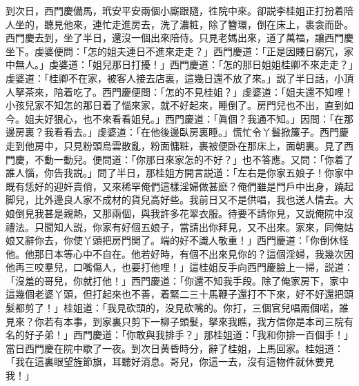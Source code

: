 到次日，西門慶備馬，玳安平安兩個小廝跟隨，徃院中來。卻説李桂姐正打扮着陪人坐的，聽見他來，連忙走進房去，洗了濃粧，除了簪環，倒在床上，裹衾而卧。西門慶去到，坐了半日，還沒一個出來陪侍。只見老媽出來，道了萬福，讓西門慶坐下。虔婆便問：「怎的姐夫連日不進來走走？」西門慶道：「正是因賤日窮冗，家中無人。」虔婆道：「姐兒那日打擾！」西門慶道：「怎的那日姐姐桂卿不來走走？」虔婆道：「桂卿不在家，被客人接去店裏，這幾日還不放了來。」説了半日話，小頂人拏茶來，陪着吃了。西門慶便問：「怎的不見桂姐？」虔婆道：「姐夫還不知哩！小孩兒家不知怎的那日着了惱來家，就不好起來，睡倒了。房門兒也不出，直到如今。姐夫好狠心，也不來看看姐兒。」西門慶道：「眞個？我通不知。」因問：「在那邊房裏？我看看去。」虔婆道：「在他後邊臥房裏睡。」慌忙令丫鬟掀簾子。西門慶走到他房中，只見粉頭烏雲散亂，粉面慵粧，裹被便卧在那床上，面朝裏。見了西門慶，不動一動兒。便問道：「你那日來家怎的不好？」也不答應。又問：「你着了誰人惱，你告我説。」問了半日，那桂姐方開言説道：「左右是你家五娘子！你家中既有恁好的迎奸賣俏，又來稀罕俺們這樣淫婦做甚麽？俺們雖是門戶中出身，蹺起脚兒，比外邊良人家不成材的貨兒高好些。我前日又不是供唱，我也送人情去。大娘倒見我甚是親熱，又那兩個，與我許多花翠衣服。待要不請你見，又説俺院中沒禮法。只聞知人説，你家有好個五娘子，當請出你拜見，又不出來。家來，同俺姑娘又辭你去，你使丫頭把房門関了。端的好不識人敬重！」西門慶道：「你倒休怪他。他那日本等心中不自在。他若好時，有個不出來見你的？這個淫婦，我幾次因他再三咬羣兒，口嘴傷人，也要打他哩！」這桂姐反手向西門慶臉上一掃，説道：「沒羞的哥兒，你就打他！」西門慶道：「你還不知我手段。除了俺家房下，家中這幾個老婆丫頭，但打起來也不善，着緊二三十馬鞭子還打不下來，好不好還把頭髮都剪了！」桂姐道：「我見砍頭的，没見砍嘴的。你打，三個官兒唱兩個喏，誰見來？你若有本事，到家裏只剪下一柳子頭髮，拏來我瞧，我方信你是本司三院有名的好子弟！」西門慶道：「你敢與我排手？」那桂姐道：「我和你排一百個手！」當日西門慶在院中歇了一夜。到次日黄昏時分，辭了桂姐，上馬回家。桂姐道：「我在這裏眼望旌節旗，耳聽好消息。哥兒，你這一去，沒有這物件就休要見我！」


